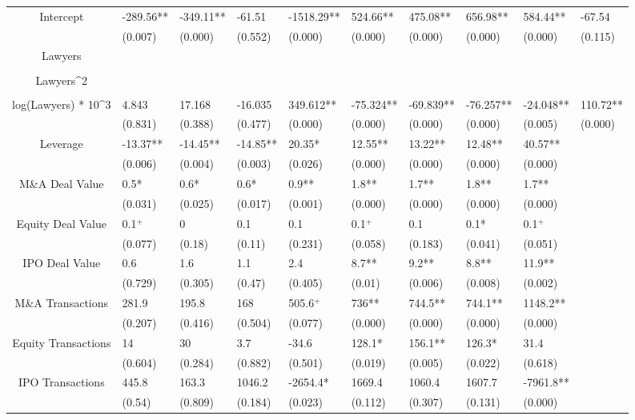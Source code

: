 \documentclass{article}
\begin{document}
\begin{table}[H]
\begin{tabular}{|clllllllll|}
Intercept & -289.56** & -349.11** & -61.51 & -1518.29** & 524.66** & 475.08** & 656.98** & 584.44** & -67.54 \\
   & (0.007) & (0.000) & (0.552) & (0.000) & (0.000) & (0.000) & (0.000) & (0.000) & (0.115) \\
  Lawyers &  &  &  &  &  &  &  &  &  \\
   &  &  &  &  &  &  &  &  &  \\
  Lawyers^2 &  &  &  &  &  &  &  &  &  \\
   &  &  &  &  &  &  &  &  &  \\
  log(Lawyers) * 10^3 & 4.843 & 17.168 & -16.035 & 349.612** & -75.324** & -69.839** & -76.257** & -24.048** & 110.72** \\
   & (0.831) & (0.388) & (0.477) & (0.000) & (0.000) & (0.000) & (0.000) & (0.005) & (0.000) \\
  Leverage & -13.37** & -14.45** & -14.85** & 20.35* & 12.55** & 13.22** & 12.48** & 40.57** &  \\
   & (0.006) & (0.004) & (0.003) & (0.026) & (0.000) & (0.000) & (0.000) & (0.000) &  \\
  M\&A Deal Value & 0.5* & 0.6* & 0.6* & 0.9** & 1.8** & 1.7** & 1.8** & 1.7** &  \\
   & (0.031) & (0.025) & (0.017) & (0.001) & (0.000) & (0.000) & (0.000) & (0.000) &  \\
  Equity Deal Value & 0.1$^{+}$ & 0 & 0.1 & 0.1 & 0.1$^{+}$ & 0.1 & 0.1* & 0.1$^{+}$ &  \\
   & (0.077) & (0.18) & (0.11) & (0.231) & (0.058) & (0.183) & (0.041) & (0.051) &  \\
  IPO Deal Value & 0.6 & 1.6 & 1.1 & 2.4 & 8.7** & 9.2** & 8.8** & 11.9** &  \\
   & (0.729) & (0.305) & (0.47) & (0.405) & (0.01) & (0.006) & (0.008) & (0.002) &  \\
  M\&A Transactions & 281.9 & 195.8 & 168 & 505.6$^{+}$ & 736** & 744.5** & 744.1** & 1148.2** &  \\
   & (0.207) & (0.416) & (0.504) & (0.077) & (0.000) & (0.000) & (0.000) & (0.000) &  \\
  Equity Transactions & 14 & 30 & 3.7 & -34.6 & 128.1* & 156.1** & 126.3* & 31.4 &  \\
   & (0.604) & (0.284) & (0.882) & (0.501) & (0.019) & (0.005) & (0.022) & (0.618) &  \\
  IPO Transactions & 445.8 & 163.3 & 1046.2 & -2654.4* & 1669.4 & 1060.4 & 1607.7 & -7961.8** &  \\
   & (0.54) & (0.809) & (0.184) & (0.023) & (0.112) & (0.307) & (0.131) & (0.000) &  \\

\end{tabular}
\end{table}
\end{document}
